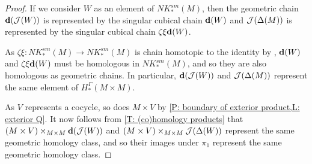 \begin{proof}
	If we consider $W$ as an element of $NK_*^{sm}(M)$, then the geometric chain $\mathbf{d}(\mathcal{J}(W))$ is represented by the singular cubical chain $\mathbf{d}(W)$ and $\mathcal{J}(\Delta(M))$ is represented by the singular cubical chain $\zeta\xi\mathbf{d}(W)$.

	As $\zeta\xi: NK_*^{sm}(M) \to NK_*^{sm}(M)$ is chain homotopic to the identity by \cite[Section XI.5]{Mas91}, $\mathbf{d}(W)$ and $\zeta\xi\mathbf{d}(W)$ must be homologous in $NK_*^{sm}(M)$, and so they are also homologous as geometric chains.
	In particular, $\mathbf{d}(\mathcal{J}(W))$ and $\mathcal{J}(\Delta(M))$ represent the same element of $H_*^\Gamma(M \times M)$.

	As $V$ represents a cocycle, so does $M \times V$ by \cref{P: boundary of exterior product,L: exterior Q}.
	It now follows from \cref{T: (co)homology products} that
	$(M \times V)\times_{M \times M} \mathbf{d}(\mathcal{J}(W))$ and $(M \times V)\times_{M \times M} \mathcal{J}(\Delta(W))$ represent the same geometric homology class, and so their images under $\pi_1$ represent the same geometric homology class.
\end{proof}

\begin{comment}
	Let $E$ be a face of the cubulation.
	Then we can think of $E$ as corresponding to a smooth singular cubical chain represented by the embedding $S_E \colon \interval^n \to M$.
	Then $\diag(\mc J(W))$ is the geometric chain represented by the smooth singular cubical chain $\diag S_E \colon \interval^n \to M \times M$, while $\mc J(\Delta(M))$ is the geometric chain represented by the smooth singular cubical chain $\zeta\xi(\diag S_E)$.
	So, more generally, $\diag(\mc J(W))$ and $\mc J(\Delta(W)))$ must be homologous in $NK^{sm}(M)$.
	So there is a smooth cubical chain $Z$ with $\bd Z = \diag(\mc J(W))-\mc J(\Delta(W)))$ as normalized smooth cubical chains.
	Now thinking of $H$ as a geometric chain, by Lemma \ref{L: product transversal}, we can find a cocycle $V'$ homologous to $V$ so that $M \times V'$ is transverse to $Z$.
	Now we compute using the boundary formula of Proposition \ref{P: Leibniz cap} and that $M \times V'$ is a cocycle that
	\begin{align*}
		\bd((M \times V')&\times_{M \times M} Z)\\
		& = \pm(\bd(M \times V'))\times_{M \times M} Z +(M \times V')\times_{M \times M} \bd Z \\
		& = (M \times V')\times_{M \times M} (\diag(\mc J(W))-\mc J(\Delta(W)))\\
		& = (M \times V')\times_{M \times M} \diag(\mc J(W)) - (M \times V')\times_{M \times M} \mc J(\Delta(W))
	\end{align*}
	Applying $\pi_1$ and that boundaries commute with maps, we obtained the desired homology.
\end{comment}

